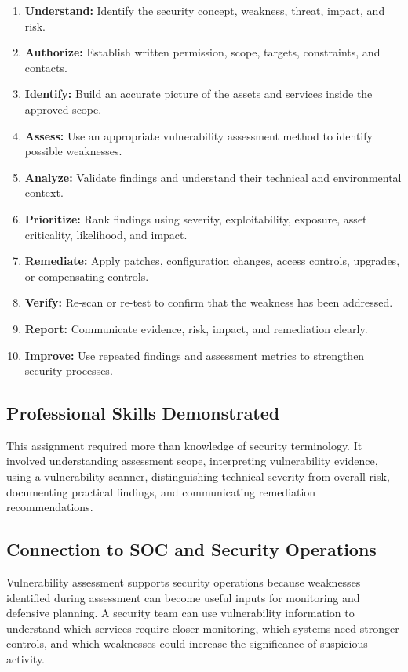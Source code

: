 \documentclass[11pt,a4paper]{article}
\begin{document}
\begin{enumerate}
\item \textbf{Understand:} Identify the security concept, weakness, threat, impact, and risk.
\item \textbf{Authorize:} Establish written permission, scope, targets, constraints, and contacts.
\item \textbf{Identify:} Build an accurate picture of the assets and services inside the approved scope.
\item \textbf{Assess:} Use an appropriate vulnerability assessment method to identify possible weaknesses.
\item \textbf{Analyze:} Validate findings and understand their technical and environmental context.
\item \textbf{Prioritize:} Rank findings using severity, exploitability, exposure, asset criticality, likelihood, and impact.
\item \textbf{Remediate:} Apply patches, configuration changes, access controls, upgrades, or compensating controls.
\item \textbf{Verify:} Re-scan or re-test to confirm that the weakness has been addressed.
\item \textbf{Report:} Communicate evidence, risk, impact, and remediation clearly.
\item \textbf{Improve:} Use repeated findings and assessment metrics to strengthen security processes.
\end{enumerate}

\subsection{Professional Skills Demonstrated}
This assignment required more than knowledge of security terminology. It involved understanding assessment scope, interpreting vulnerability evidence, using a vulnerability scanner, distinguishing technical severity from overall risk, documenting practical findings, and communicating remediation recommendations.

\subsection{Connection to SOC and Security Operations}
Vulnerability assessment supports security operations because weaknesses identified during assessment can become useful inputs for monitoring and defensive planning. A security team can use vulnerability information to understand which services require closer monitoring, which systems need stronger controls, and which weaknesses could increase the significance of suspicious activity.
\end{document}
